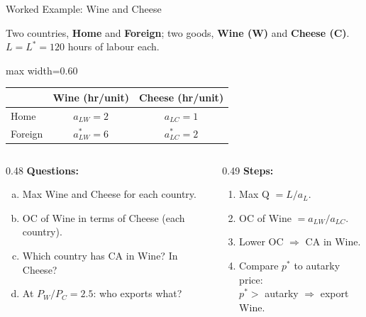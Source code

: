 \documentclass[aspectratio=169]{beamer}
\begin{document}
\begin{frame}{Worked Example: Wine and Cheese}
\begin{worked}
Two countries, \textbf{Home} and \textbf{Foreign}; two
goods, \textbf{Wine (W)} and \textbf{Cheese (C)}.
$L=L^{*}=120$ hours of labour each.
\end{worked}
\vspace{0.3em}
\begin{center}
\begin{adjustbox}{max width=0.60\textwidth}
\begin{tabular}{lcc}
\toprule
 & Wine (hr/unit) & Cheese (hr/unit)\\
\midrule
Home    & $a_{LW}=2$     & $a_{LC}=1$  \\
Foreign & $a_{LW}^{*}=6$ & $a_{LC}^{*}=2$\\
\bottomrule
\end{tabular}
\end{adjustbox}
\end{center}
\vspace{0.3em}
\begin{columns}[T]
\begin{column}{0.48\textwidth}
\textbf{Questions:}
\begin{enumerate}[(a)]\small
  \item Max Wine and Cheese for each country.
  \item OC of Wine in terms of Cheese (each country).
  \item Which country has CA in Wine?  In Cheese?
  \item At $P_W/P_C=2.5$: who exports what?
\end{enumerate}
\end{column}
\begin{column}{0.49\textwidth}
\textbf{Steps:}
\begin{enumerate}\small
  \item Max Q $= L/a_L$.
  \item OC of Wine $= a_{LW}/a_{LC}$.
  \item Lower OC $\Rightarrow$ CA in Wine.
  \item Compare $p^{*}$ to autarky price:\\
        $p^{*}>$ autarky $\Rightarrow$ export Wine.
\end{enumerate}
\end{column}
\end{columns}
\end{frame}
\end{document}
